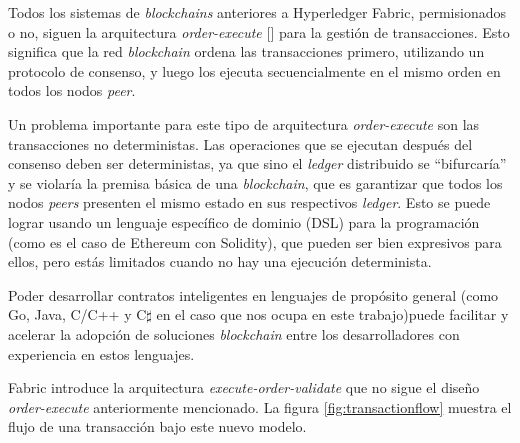 
Todos los sistemas de \textit{blockchains} anteriores a Hyperledger Fabric, permisionados o no, siguen la arquitectura  \textit{order-execute} [\cite{hlf-paper}] para la gestión de transacciones. Esto significa que la red \textit{blockchain} ordena las transacciones primero, utilizando un protocolo de consenso, y luego los ejecuta secuencialmente en el mismo orden en todos los nodos \textit{peer}.


Un problema importante para este tipo de arquitectura \textit{order-execute} son las transacciones no deterministas. Las operaciones que se ejecutan después del consenso deben ser deterministas, ya que sino el \textit{ledger} distribuido se “bifurcaría” y se violaría la premisa básica de una \textit{blockchain}, que es garantizar que todos los nodos \textit{peers} presenten el mismo estado en sus respectivos \textit{ledger}. Esto se puede lograr usando un lenguaje específico de dominio (DSL) para la programación (como es el caso de Ethereum con Solidity), que pueden ser bien expresivos para ellos, pero estás limitados cuando no hay una ejecución determinista.

Poder desarrollar contratos inteligentes en lenguajes de propósito general (como Go, Java, C/C++ y C$\sharp$ en el caso que nos ocupa en este trabajo)puede facilitar y acelerar la adopción de soluciones \textit{blockchain} entre los desarrolladores con experiencia en estos lenguajes.


Fabric introduce la arquitectura \textit{execute-order-validate} que no sigue el diseño \textit{order-execute} anteriormente mencionado. La figura \ref{fig:transactionflow} muestra el flujo de una transacción bajo este nuevo modelo.\\[5cm]

